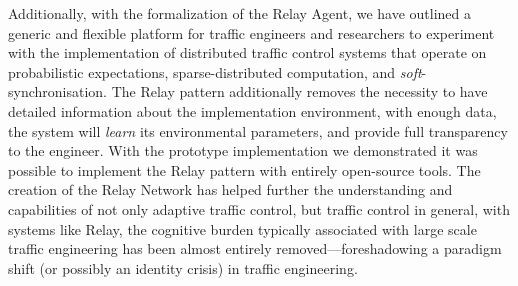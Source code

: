 \documentclass[a4paper,10pt]{article}
\begin{document}
\begin{multicols}{2}
Additionally, with the formalization of the Relay Agent, we have outlined a generic and flexible platform for traffic engineers and researchers to experiment with the implementation of distributed traffic control systems that operate on probabilistic expectations, sparse-distributed computation, and \emph{soft}-synchronisation.
The Relay pattern additionally removes the necessity to have detailed information about the implementation environment, with enough data, the system will \emph{learn} its environmental parameters, and provide full transparency to the engineer.
With the prototype implementation we demonstrated it was possible to implement the Relay pattern with entirely open-source tools.
The creation of the Relay Network has helped further the understanding and capabilities of not only adaptive traffic control, but traffic control in general, with systems like Relay, the cognitive burden typically associated with large scale traffic engineering has been almost entirely removed---foreshadowing a paradigm shift (or possibly an identity crisis) in traffic engineering.





\end{multicols}
\end{document}
